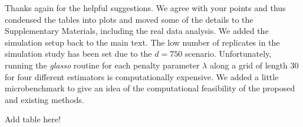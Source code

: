 \begin{reply}
    Thanks again for the helpful suggestions. We agree with your points and thus condensed the tables into plots and moved some of the details to the Supplementary Materials, including the real data analysis. We added the simulation setup back to the main text. The low number of replicates in the simulation study has been set due to the \(d=750\) scenario. Unfortunately, running the \textit{glasso} routine for each penalty parameter \(\lambda\) along a grid of length 30 for four different estimators is computationally expensive. We added a little microbenchmark to give an idea of the computational feasibility of the proposed and existing methods.
\end{reply}

\begin{change}
    Add table here!
\end{change}